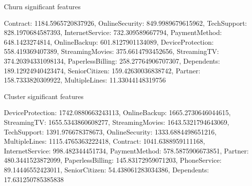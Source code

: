 \documentclass[letterpaper,10pt,english]{jupyterBook}
\begin{document}
\begin{sphinxVerbatim}[commandchars=\\\{\}]
Churn significant features
\end{sphinxVerbatim}

\begin{sphinxVerbatim}[commandchars=\\\{\}]
\PYGZob{}\PYGZsq{}Contract\PYGZsq{}: 1184.5965720837926,
 \PYGZsq{}OnlineSecurity\PYGZsq{}: 849.9989679615962,
 \PYGZsq{}TechSupport\PYGZsq{}: 828.1970684587393,
 \PYGZsq{}InternetService\PYGZsq{}: 732.309589667794,
 \PYGZsq{}PaymentMethod\PYGZsq{}: 648.1423274814,
 \PYGZsq{}OnlineBackup\PYGZsq{}: 601.8127901134089,
 \PYGZsq{}DeviceProtection\PYGZsq{}: 558.419369407389,
 \PYGZsq{}StreamingMovies\PYGZsq{}: 375.6614793452656,
 \PYGZsq{}StreamingTV\PYGZsq{}: 374.20394331098134,
 \PYGZsq{}PaperlessBilling\PYGZsq{}: 258.27764906707307,
 \PYGZsq{}Dependents\PYGZsq{}: 189.12924940423474,
 \PYGZsq{}SeniorCitizen\PYGZsq{}: 159.42630036838742,
 \PYGZsq{}Partner\PYGZsq{}: 158.7333820309922,
 \PYGZsq{}MultipleLines\PYGZsq{}: 11.33044148319756\PYGZcb{}
\end{sphinxVerbatim}

\begin{sphinxVerbatim}[commandchars=\\\{\}]
 \PYG{p}{[}\PYG{p}{]}     
\end{sphinxVerbatim}

\begin{sphinxVerbatim}[commandchars=\\\{\}]
Cluster significant features
\end{sphinxVerbatim}

\begin{sphinxVerbatim}[commandchars=\\\{\}]
\PYGZob{}\PYGZsq{}DeviceProtection\PYGZsq{}: 1742.0880663243113,
 \PYGZsq{}OnlineBackup\PYGZsq{}: 1665.2730646044615,
 \PYGZsq{}StreamingTV\PYGZsq{}: 1655.5343860608277,
 \PYGZsq{}StreamingMovies\PYGZsq{}: 1643.5321794643069,
 \PYGZsq{}TechSupport\PYGZsq{}: 1391.976678378673,
 \PYGZsq{}OnlineSecurity\PYGZsq{}: 1333.6884498651216,
 \PYGZsq{}MultipleLines\PYGZsq{}: 1115.4765363222418,
 \PYGZsq{}Contract\PYGZsq{}: 1041.6388959111168,
 \PYGZsq{}InternetService\PYGZsq{}: 998.482344451734,
 \PYGZsq{}PaymentMethod\PYGZsq{}: 578.5875906673851,
 \PYGZsq{}Partner\PYGZsq{}: 480.3441523872099,
 \PYGZsq{}PaperlessBilling\PYGZsq{}: 145.83172959071203,
 \PYGZsq{}PhoneService\PYGZsq{}: 89.14446552423011,
 \PYGZsq{}SeniorCitizen\PYGZsq{}: 54.438061283034386,
 \PYGZsq{}Dependents\PYGZsq{}: 17.631250785385838\PYGZcb{}
\end{sphinxVerbatim}
\end{document}
